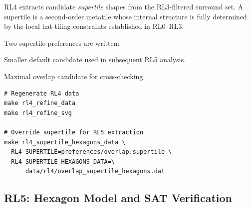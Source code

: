 \documentclass[10pt,a4paper]{article}
\newcommand{\file}[1]{\texttt{\footnotesize #1}}
\begin{document}
\begin{tcolorbox}[dualbox, title=RL4 — Supertile Candidates — \file{src/rl4/}]
  RL4 extracts candidate \emph{supertile} shapes from the RL3-filtered
  surround set.  A supertile is a second-order metatile whose internal
  structure is fully determined by the local hat-tiling constraints
  established in RL0–RL3.

  Two supertile preferences are written:
  \begin{description}[leftmargin=0pt]
    \item[\file{preferences/focus.supertile}] Smaller default
      candidate used in subsequent RL5 analysis.
    \item[\file{preferences/overlap.supertile}] Maximal overlap
      candidate for cross-checking.
  \end{description}
\tcblower
\begin{verbatim}
# Regenerate RL4 data
make rl4_refine_data
make rl4_refine_svg

# Override supertile for RL5 extraction
make rl4_supertile_hexagons_data \
  RL4_SUPERTILE=preferences/overlap.supertile \
  RL4_SUPERTILE_HEXAGONS_DATA=\
      data/rl4/overlap_supertile_hexagons.dat
\end{verbatim}
\end{tcolorbox}

\subsection{RL5: Hexagon Model and SAT Verification}
\end{document}
